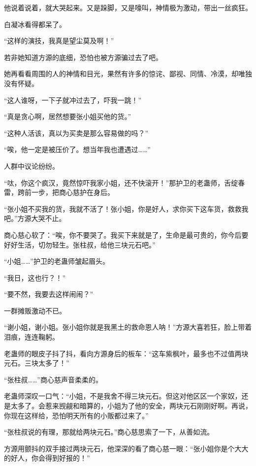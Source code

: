 \begin{this_body}
他说着说着，就大哭起来。又是跺脚，又是嚎叫，神情极为激动，带出一丝疯狂。

白凝冰看得都呆了。

“这样的演技，我真是望尘莫及啊！”

若非她知道方源的底细，恐怕也被方源骗过去了吧。

她再看看周围的人的神情和目光，果然有许多的惊诧、鄙视、同情、冷漠，却唯独没有怀疑。

“这人谁呀，一下子就冲过去了，吓我一跳！”

“真是贪心啊，居然想要张小姐买他的货。”

“这种人活该，真以为买卖是那么容易做的吗？”

“唉，他一定是被压价了。想当年我也遭遇过……”

人群中议论纷纷。

“呔，你这个疯汉，竟然惊吓我家小姐，还不快滚开！”那护卫的老蛊师，舌绽春雷，跨前一步，把商心慈护在身后。

“张小姐不买我的货，我就不活了！张小姐，你是好人，求你买下这车货，救救我吧。”方源大哭不止。

商心慈心软了：“唉，你不要哭了。我买下来就是了，生命是最可贵的，你今后要好好生活，切勿轻生。张柱叔，给他三块元石吧。”

“小姐……”护卫的老蛊师皱起眉头。

“我日，这也行？！”

“要不然，我要去这样闹闹？”

一群摊贩激动不已。

“谢小姐，谢小姐。张小姐你就是我黑土的救命恩人呐！”方源大喜若狂，脸上带着泪痕，连连鞠躬。

老蛊师的眼皮子抖了抖，看向方源身后的板车：“这车紫枫叶，最多也不过值两块元石。三块太多了！”

“张柱叔……”商心慈声音柔柔的。

老蛊师深叹一口气：“小姐，不是我舍不得三块元石。但这对他区区一个家奴，还是太多了。会惹来觊觎和暗算的，小姐为了他的安全，两块元石刚刚好啊。再说，你现在这样给，恐怕明天所有的小贩都过来了。”

“张柱叔说的有理，那就给两块元石。”商心慈思索了一下，从善如流。

方源用颤抖的双手接过两块元石，他深深的看了商心慈一眼：“张小姐你是个大大的好人，你会得到好报的！”

\end{this_body}

